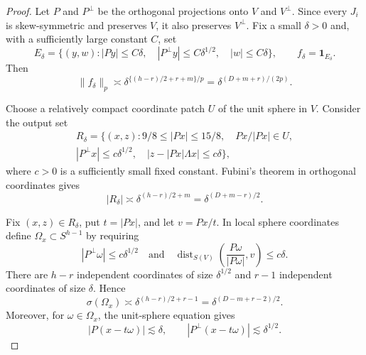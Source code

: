 \documentclass[11pt]{article}
\newcommand{\one}{\mathbf 1}
\begin{document}
\begin{proof}
Let $P$ and $P^\perp$ be the orthogonal projections onto $V$ and
$V^\perp$.  Since every $J_i$ is skew-symmetric and preserves $V$, it also
preserves $V^\perp$.  Fix a small $\delta>0$ and, with a sufficiently large
constant $C$, set
\[
 E_\delta=\{(y,w): |Py|\leq C\delta,\quad
 |P^\perp y|\leq C\delta^{1/2},\quad |w|\leq C\delta\},
 \qquad f_\delta=\one_{E_\delta}.
\]
Then
\begin{equation}\label{eq:inputnorm}
 \|f_\delta\|_p\asymp
 \delta^{\{(h-r)/2+r+m\}/p}
 =\delta^{(D+m+r)/(2p)}.
\end{equation}

Choose a relatively compact coordinate patch $U$ of the unit sphere in $V$.
Consider the output set
\begin{multline}\label{eq:outputset}
 R_\delta=\{(x,z): 9/8\leq |Px|\leq15/8,\quad
 Px/|Px|\in U,\\
 |P^\perp x|\leq c\delta^{1/2},\quad
 |z-|Px|\Lambda x|\leq c\delta\},
\end{multline}
where $c>0$ is a sufficiently small fixed constant.  Fubini's theorem in
orthogonal coordinates gives
\begin{equation}\label{eq:outputvolume}
 |R_\delta|\asymp \delta^{(h-r)/2+m}
 =\delta^{(D+m-r)/2}.
\end{equation}

Fix $(x,z)\in R_\delta$, put $t=|Px|$, and let $v=Px/t$.  In local sphere
coordinates define $\Omega_x\subset S^{h-1}$ by requiring
\[
 |P^\perp\omega|\leq c\delta^{1/2}
 \quad\text{and}\quad
 \operatorname{dist}_{S(V)}
 \left(\frac{P\omega}{|P\omega|},v\right)\leq c\delta.
\]
There are $h-r$ independent coordinates of size $\delta^{1/2}$ and $r-1$
independent coordinates of size $\delta$.  Hence
\begin{equation}\label{eq:capmeasure}
 \sigma(\Omega_x)\asymp
 \delta^{(h-r)/2+r-1}
 =\delta^{(D-m+r-2)/2}.
\end{equation}
Moreover, for $\omega\in\Omega_x$, the unit-sphere equation gives
\begin{equation}\label{eq:horizontalerrors}
 |P(x-t\omega)|\lesssim\delta,
 \qquad |P^\perp(x-t\omega)|\lesssim\delta^{1/2}.
\end{equation}


\end{proof}
\end{document}
